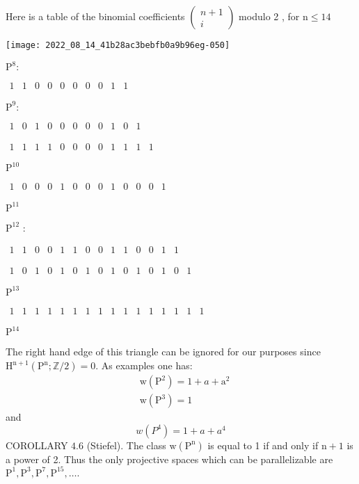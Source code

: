 \documentclass[10pt]{article}
\begin{document}
Here is a table of the binomial coefficients $\left(\begin{array}{c}n+1 \\ i\end{array}\right)$ modulo 2 , for $\mathrm{n} \leq 14$

\texttt{[image: 2022\_08\_14\_41b28ac3bebfb0a9b96eg-050]}

$\mathrm{P}^{8}:$

$\begin{array}{llllllllll}1 & 1 & 0 & 0 & 0 & 0 & 0 & 0 & 1 & 1\end{array}$

$\mathrm{P}^{9}:$

$\begin{array}{lllllllllll}1 & 0 & 1 & 0 & 0 & 0 & 0 & 0 & 1 & 0 & 1\end{array}$

$\begin{array}{llllllllllll}1 & 1 & 1 & 1 & 0 & 0 & 0 & 0 & 1 & 1 & 1 & 1\end{array}$

$\mathrm{P}^{10}$

$\begin{array}{lllllllllllll}1 & 0 & 0 & 0 & 1 & 0 & 0 & 0 & 1 & 0 & 0 & 0 & 1\end{array}$

$\mathrm{P}^{11}$

$\mathrm{P}^{12}$ :

$\begin{array}{llllllllllllll}1 & 1 & 0 & 0 & 1 & 1 & 0 & 0 & 1 & 1 & 0 & 0 & 1 & 1\end{array}$

$\begin{array}{lllllllllllllll}1 & 0 & 1 & 0 & 1 & 0 & 1 & 0 & 1 & 0 & 1 & 0 & 1 & 0 & 1\end{array}$

$\mathrm{P}^{13}$

$\begin{array}{llllllllllllllll}1 & 1 & 1 & 1 & 1 & 1 & 1 & 1 & 1 & 1 & 1 & 1 & 1 & 1 & 1 & 1\end{array}$

$\mathrm{P}^{14}$

The right hand edge of this triangle can be ignored for our purposes since $\mathrm{H}^{\mathrm{n}+1}\left(\mathrm{P}^{\mathrm{n}} ; \mathbb{Z} / 2\right)=0$. As examples one has:
$$
\begin{aligned}
&\mathrm{w}\left(\mathrm{P}^{2}\right)=1+a+\mathrm{a}^{2} \\
&\mathrm{w}\left(\mathrm{P}^{3}\right)=1
\end{aligned}
$$
and
$$
w\left(P^{4}\right)=1+a+a^{4}
$$
COROLLARY $4.6$ (Stiefel). The class $\mathrm{w}\left(\mathrm{P}^{\mathrm{n}}\right)$ is equal to 1 if and only if $\mathrm{n}+1$ is a power of 2. Thus the only projective spaces which can be parallelizable are $\mathrm{P}^{1}, \mathrm{P}^{3}, \mathrm{P}^{7}, \mathrm{P}^{15}, \ldots .$
\end{document}
